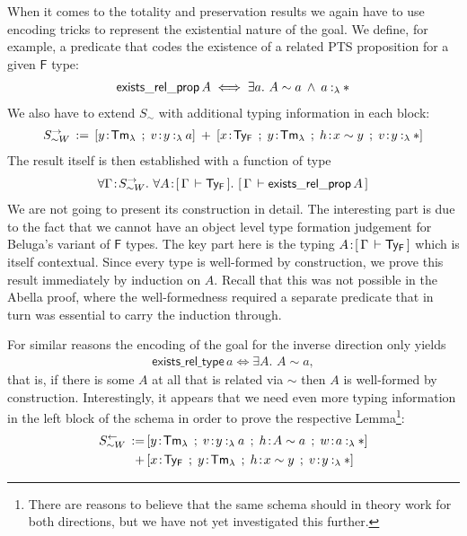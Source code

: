 \documentclass[a4paper,UKenglish]{lipics-v2016}
\newcommand{\ms}{\,}
\newcommand{\mrel}[1]{\mathrel{\ms #1 \ms}}
\newcommand{\mAnd}{\mrel{\wedge}}
\newcommand{\mAll}[1]{\ensuremath{\forall} #1.\ms\ms}
\newcommand{\mEx}[1]{\ensuremath{\exists} #1.\ms\ms}
\newcommand{\eqdef}{\mrel{:=}}
\newcommand{\SysF}{\ensuremath{\mathsf{F}}\xspace}
\newcommand{\TyF}{\ensuremath{\mathsf{Ty_{F}}}}
\newcommand{\TmL}{\ensuremath{\mathsf{Tm_{\lambda}}}}
\newcommand{\of}{\ensuremath{\!:\!}}
\newcommand{\typingLh}[2]{\ensuremath{#1 \mathbin{:_{\lambda}} #2}}
\newcommand{\tyr}{\mathrel{\sim}}
\newcommand{\Prp}{\ensuremath{\textrm{\textasteriskcentered}}}
\begin{document}
When it comes to the totality and preservation results we again have to use encoding tricks to represent the existential nature of the goal.
We define, for example, a predicate that codes the existence of a related PTS proposition for a given \SysF type:
\begin{align*}
  \mathsf{exists\_rel\_prop}\,A \iff \mEx{a} A \tyr a \mAnd \typingLh{a}{\Prp}
\end{align*}
We also have to extend $S_{\tyr}$ with additional typing information in each block:
\begin{align*}
  S_{\tyr W}^{\rightarrow} \eqdef [y\of\TmL \mrel{;} v\of\typingLh{y}{a}] \mrel{+} [x\of\TyF \mrel{;} y\of\TmL \mrel{;} h\of x \tyr y \mrel{;} v\of\typingLh{y}{\Prp}]
\end{align*}
The result itself is then established with a function of type
\begin{align*}
  \mAll{\Gamma \of S_{\tyr W}^{\rightarrow}} \mAll{A \of \bc{\Gamma}{\TyF}} \bc{\Gamma}{\mathsf{exists\_rel\_prop}\,A}
\end{align*}
We are not going to present its construction in detail.
The interesting part is due to the fact that we cannot have an object level type formation judgement for Beluga's variant of \SysF types.
The key part here is the typing $A \of \bc{\Gamma}{\TyF}$ which is itself contextual.
Since every type is well-formed by construction, we prove this result immediately by induction on $A$.
Recall that this was not possible in the Abella proof, where the well-formedness required a separate predicate that in turn was essential to carry the induction through.

For similar reasons the encoding of the goal for the inverse direction only yields
\begin{align*}
  \mathsf{exists\_rel\_type}\,a \iff \mEx{A} A \tyr a,
\end{align*}
that is, if there is some $A$ at all that is related via $\tyr$ then $A$ is well-formed by construction.
Interestingly, it appears that we need even more typing information in the left block of the schema in order to prove the respective Lemma\footnote{There are reasons to believe that the same schema should  in theory work for both directions, but we have not yet investigated this further.}:
\begin{align*}
  S_{\tyr W}^{\leftarrow} \eqdef &[y\of\TmL \mrel{;} v\of\typingLh{y}{a} \mrel{;} h\of A \tyr a \mrel{;} w \of \typingLh{a}{\Prp}]\\
  \mrel{+} &[x\of\TyF \mrel{;} y\of\TmL \mrel{;} h\of x \tyr y \mrel{;} v\of\typingLh{y}{\Prp}]
\end{align*}
\end{document}
